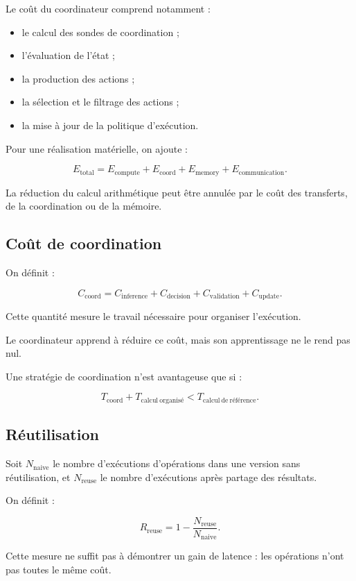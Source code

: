 \documentclass[11pt,a4paper]{article}
\begin{document}
Le coût du coordinateur comprend notamment :
\begin{itemize}
  \item le calcul des sondes de coordination ;
  \item l'évaluation de l'état ;
  \item la production des actions ;
  \item la sélection et le filtrage des actions ;
  \item la mise à jour de la politique d'exécution.
\end{itemize}

Pour une réalisation matérielle, on ajoute :

\[
E_{\mathrm{total}}
=
E_{\mathrm{compute}}
+E_{\mathrm{coord}}
+E_{\mathrm{memory}}
+E_{\mathrm{communication}}.
\]

La réduction du calcul arithmétique peut être annulée par le coût
des transferts, de la coordination ou de la mémoire.

\subsection{Coût de coordination}

On définit :

\[
C_{\mathrm{coord}}
=
C_{\mathrm{inference}}
+
C_{\mathrm{decision}}
+
C_{\mathrm{validation}}
+
C_{\mathrm{update}}.
\]

Cette quantité mesure le travail nécessaire pour organiser
l'exécution.

Le coordinateur apprend à réduire ce coût, mais son apprentissage
ne le rend pas nul.

Une stratégie de coordination n'est avantageuse que si :

\[
T_{\mathrm{coord}}
+
T_{\mathrm{calcul\ organisé}}
<
T_{\mathrm{calcul\ de\ référence}}.
\]

\subsection{Réutilisation}

Soit $N_{\mathrm{naive}}$ le nombre d'exécutions d'opérations dans
une version sans réutilisation, et $N_{\mathrm{reuse}}$ le nombre
d'exécutions après partage des résultats.

On définit :

\[
R_{\mathrm{reuse}}
=
1-
\frac{N_{\mathrm{reuse}}}{N_{\mathrm{naive}}}.
\]

Cette mesure ne suffit pas à démontrer un gain de latence :
les opérations n'ont pas toutes le même coût.
\end{document}
